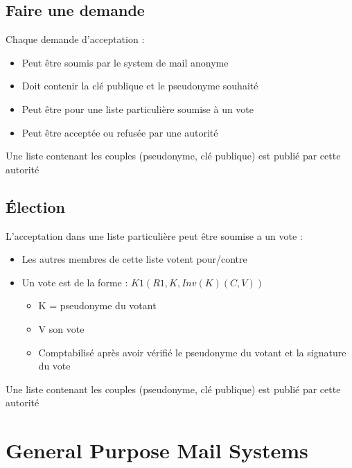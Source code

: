 \documentclass{beamer}
\begin{document}
\subsection{Faire une demande}
\begin{frame}
Chaque demande d'acceptation :
\begin{itemize}
[triangle]
\item Peut être soumis par le system de mail anonyme
\item Doit contenir la clé publique et le pseudonyme souhaité
\item Peut être pour une liste particulière soumise à un vote
\item Peut être acceptée ou refusée par une autorité
\end{itemize}
Une liste contenant les couples (pseudonyme, clé publique) est publié par cette autorité  
\end{frame}

\subsection{Élection}
\begin{frame}
L'acceptation dans une liste particulière peut être soumise a un vote :
\begin{itemize}
[triangle]
\item Les autres membres de cette liste votent pour/contre
\item Un vote est de la forme : $K1( R1, K, Inv(K)( C, V ))$
\pause
	\begin{itemize}
		\item K = pseudonyme du votant
		\item V son vote
		\item Comptabilisé après avoir vérifié le pseudonyme du votant et la signature du vote
	\end{itemize}
\end{itemize}
Une liste contenant les couples (pseudonyme, clé publique) est publié par cette autorité  
\end{frame}


\section{General Purpose Mail Systems}
\end{document}
